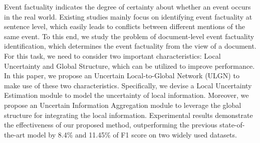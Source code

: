 Event factuality indicates the degree of certainty about whether an event occurs in the real world. Existing studies mainly focus on identifying event factuality at sentence level, which easily leads to conflicts between different mentions of the same event. To this end, we study the problem of document-level event factuality identification, which determines the event factuality from the view of a document. For this task, we need to consider two important characteristics: Local Uncertainty and Global Structure, which can be utilized to improve performance. In this paper, we propose an Uncertain Local-to-Global Network (ULGN) to make use of these two characteristics. Specifically, we devise a Local Uncertainty Estimation module to model the uncertainty of local information. Moreover, we propose an Uncertain Information Aggregation module to leverage the global structure for integrating the local information. Experimental results demonstrate the effectiveness of our proposed method, outperforming the previous state-of-the-art model by 8.4\% and 11.45\% of F1 score on two widely used datasets.
